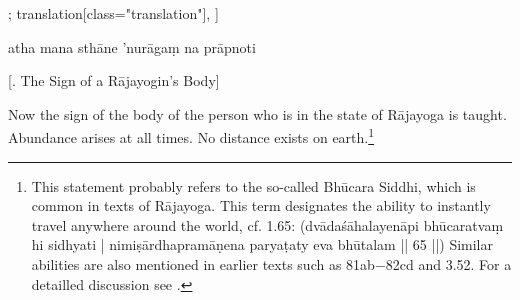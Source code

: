 \begin{alignment}[
  texts=edition[class="edition"];
  translation[class="translation"],
  ]
\begin{edition}
\begin{prose}
atha 
mana
sthāne 'nurāgaṃ na prāpnoti\dd{}
\end{prose}
  \end{edition}
  \begin{translation}
    \centerline{\textrm{\small{[.\textsuperscript{} The Sign of a Rājayogin's Body]}}}
    \label{rajabodytrans}
    \bigskip
    \begin{tlate}
      \noindent
        Now the sign of the body of the person who is in the state of Rājayoga is taught. Abundance arises at all times. No distance exists on earth.\footnote{This statement probably refers to the so-called Bhūcara Siddhi, which is common in texts of Rājayoga. This term designates the ability to instantly travel anywhere around the world, cf.  1.65: (dvādaśāhalayenāpi bhūcaratvaṃ hi sidhyati | nimiṣārdhapramāṇena paryaṭaty eva bhūtalam || 65 ||) Similar abilities are also mentioned in earlier texts such as  81ab−82cd and  3.52. For a detailled discussion see \citeauthor[2013: 275, endnote 91]{birch2013}.}

\end{tlate}
\end{translation}
\end{alignment}
